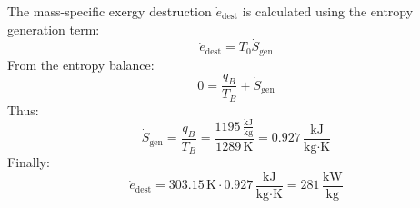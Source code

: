 The mass-specific exergy destruction \( \dot{e}_{\text{dest}} \) is calculated using the entropy generation term:  
\[
\dot{e}_{\text{dest}} = T_0 \dot{S}_{\text{gen}}
\]  
From the entropy balance:  
\[
0 = \frac{q_B}{T_B} + \dot{S}_{\text{gen}}
\]  
Thus:  
\[
\dot{S}_{\text{gen}} = \frac{q_B}{T_B} = \frac{1195 \, \frac{\text{kJ}}{\text{kg}}}{1289 \, \text{K}} = 0.927 \, \frac{\text{kJ}}{\text{kg·K}}
\]  
Finally:  
\[
\dot{e}_{\text{dest}} = 303.15 \, \text{K} \cdot 0.927 \, \frac{\text{kJ}}{\text{kg·K}} = 281 \, \frac{\text{kW}}{\text{kg}}
\]